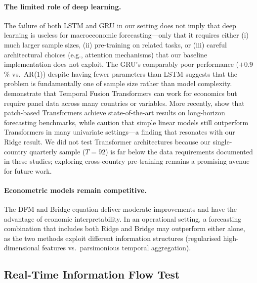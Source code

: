 \paragraph{The limited role of deep learning.}
The failure of both LSTM and GRU in our setting does not imply that deep learning is useless for macroeconomic forecasting---only that it requires either (i) much larger sample sizes, (ii) pre-training on related tasks, or (iii) careful architectural choices (e.g., attention mechanisms) that our baseline implementation does not exploit.  The GRU's comparably poor performance ($+0.9$\% vs.~AR(1)) despite having fewer parameters than LSTM suggests that the problem is fundamentally one of sample size rather than model complexity.  \citet{lim2021temporal} demonstrate that Temporal Fusion Transformers can work for economics but require panel data across many countries or variables.  More recently, \citet{nie2023patchtst} show that patch-based Transformers achieve state-of-the-art results on long-horizon forecasting benchmarks, while \citet{zeng2023transformers} caution that simple linear models still outperform Transformers in many univariate settings---a finding that resonates with our Ridge result.  We did not test Transformer architectures because our single-country quarterly sample ($T = 92$) is far below the data requirements documented in these studies; exploring cross-country pre-training remains a promising avenue for future work.

\paragraph{Econometric models remain competitive.}
The DFM and Bridge equation deliver moderate improvements and have the advantage of economic interpretability.  In an operational setting, a forecasting combination that includes both Ridge and Bridge may outperform either alone, as the two methods exploit different information structures (regularised high-dimensional features vs.\ parsimonious temporal aggregation).

\subsection{Real-Time Information Flow Test}

